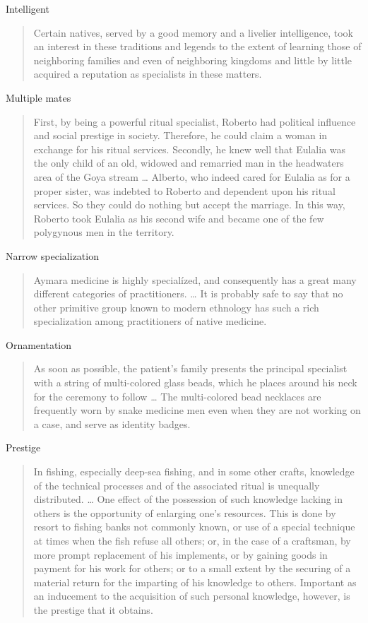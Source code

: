 \documentclass[
]{article}
\begin{document}
Intelligent

\begin{quote}
Certain natives, served by a good memory and a livelier intelligence, took an interest in these traditions and legends to the extent of learning those of neighboring families and even of neighboring kingdoms and little by little acquired a reputation as specialists in these matters.
\end{quote}

Multiple mates

\begin{quote}
First, by being a powerful ritual specialist, Roberto had political influence and social prestige in society. Therefore, he could claim a woman in exchange for his ritual services. Secondly, he knew well that Eulalia was the only child of an old, widowed and remarried man in the headwaters area of the Goya stream \ldots{} Alberto, who indeed cared for Eulalia as for a proper sister, was indebted to Roberto and dependent upon his ritual services. So they could do nothing but accept the marriage. In this way, Roberto took Eulalia as his second wife and became one of the few polygynous men in the territory.
\end{quote}

Narrow specialization

\begin{quote}
Aymara medicine is highly specialízed, and consequently has a great many different categories of practitioners. \ldots{} It is probably safe to say that no other primitive group known to modern ethnology has such a rich specialization among practitioners of native medicine.
\end{quote}

Ornamentation

\begin{quote}
As soon as possible, the patient's family presents the principal specialist with a string of multi-colored glass beads, which he places around his neck for the ceremony to follow \ldots{} The multi-colored bead necklaces are frequently worn by snake medicine men even when they are not working on a case, and serve as identity badges.
\end{quote}

Prestige

\begin{quote}
In fishing, especially deep-sea fishing, and in some other crafts, knowledge of the technical processes and of the associated ritual is unequally distributed. \ldots{} One effect of the possession of such knowledge lacking in others is the opportunity of enlarging one's resources. This is done by resort to fishing banks not commonly known, or use of a special technique at times when the fish refuse all others; or, in the case of a craftsman, by more prompt replacement of his implements, or by gaining goods in payment for his work for others; or to a small extent by the securing of a material return for the imparting of his knowledge to others. Important as an inducement to the acquisition of such personal knowledge, however, is the prestige that it obtains.
\end{quote}
\end{document}
